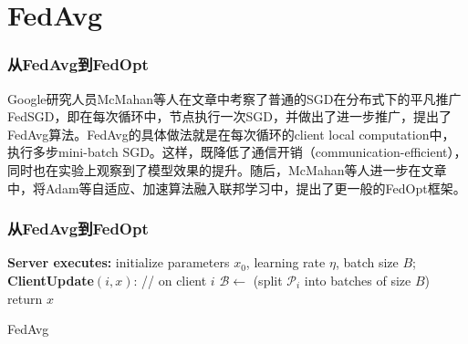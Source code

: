 
\section{FedAvg}  %


\begin{frame}
\frametitle{从FedAvg到FedOpt}

Google研究人员McMahan等人在文章\cite{mcmahan2017fed_avg}中考察了普通的SGD在分布式下的平凡推广FedSGD，即在每次循环中，节点执行一次SGD，并做出了进一步推广，提出了FedAvg算法。FedAvg的具体做法就是在每次循环的client local computation中，执行多步mini-batch SGD。这样，既降低了通信开销（communication-efficient），同时也在实验上观察到了模型效果的提升。随后，McMahan等人进一步在文章\cite{reddi2020fed_opt}中，将Adam等自适应、加速算法融入联邦学习中，提出了更一般的FedOpt框架。


\end{frame}


\begin{frame}
\frametitle{从FedAvg到FedOpt}

\begin{algorithm}[H]
\SetAlgoNoLine
\DontPrintSemicolon
{\bfseries Server executes:}\;
\Indp initialize parameters $x_0$, learning rate $\eta$, batch size $B$;
\Indm
\vspace{0.2em}
{\bfseries ClientUpdate}$(i, x)$: // on client $i$\;
\Indp $\mathcal{B} \gets$ (split $\mathcal{P}_i$ into batches of size $B$)\;
return $x$\;
\caption{FedAvg}
\end{algorithm}

\end{frame}

